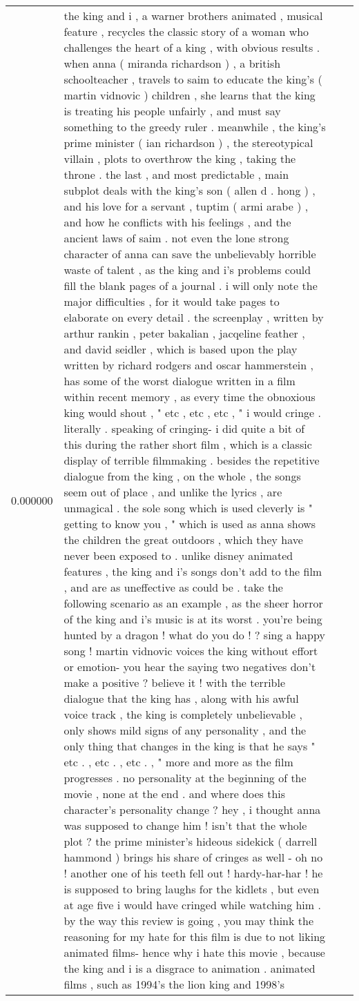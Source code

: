 \begin{tabular}{r{1cm} p{0.4in} r{1cm} p{0.4in}}
0.000000 & the king and i , a warner brothers animated , musical feature , recycles the classic story of a woman who challenges the heart of a king , with obvious results .  when anna ( miranda richardson ) , a british schoolteacher , travels to saim to educate the king's ( martin vidnovic ) children , she learns that the king is treating his people unfairly , and must say something to the greedy ruler .  meanwhile , the king's prime minister ( ian richardson ) , the stereotypical villain , plots to overthrow the king , taking the throne .  the last , and most predictable , main subplot deals with the king's son ( allen d . hong ) , and his love for a servant , tuptim ( armi arabe ) , and how he conflicts with his feelings , and the ancient laws of saim .  not even the lone strong character of anna can save the unbelievably horrible waste of talent , as the king and i's problems could fill the blank pages of a journal .  i will only note the major difficulties , for it would take pages to elaborate on every detail .  the screenplay , written by arthur rankin , peter bakalian , jacqeline feather , and david seidler , which is based upon the play written by richard rodgers and oscar hammerstein , has some of the worst dialogue written in a film within recent memory , as every time the obnoxious king would shout , " etc , etc , etc , " i would cringe .  literally .  speaking of cringing- i did quite a bit of this during the rather short film , which is a classic display of terrible filmmaking .  besides the repetitive dialogue from the king , on the whole , the songs seem out of place , and unlike the lyrics , are unmagical .  the sole song which is used cleverly is " getting to know you , " which is used as anna shows the children the great outdoors , which they have never been exposed to .  unlike disney animated features , the king and i's songs don't add to the film , and are as uneffective as could be .  take the following scenario as an example , as the sheer horror of the king and i's music is at its worst .  you're being hunted by a dragon !  what do you do ! ?  sing a happy song !  martin vidnovic voices the king without effort or emotion- you hear the saying two negatives don't make a positive ?  believe it !  with the terrible dialogue that the king has , along with his awful voice track , the king is completely unbelievable , only shows mild signs of any personality , and the only thing that changes in the king is that he says " etc . , etc . , etc . , " more and more as the film progresses .  no personality at the beginning of the movie , none at the end .  and where does this character's personality change ?  hey , i thought anna was supposed to change him !  isn't that the whole plot ?  the prime minister's hideous sidekick ( darrell hammond ) brings his share of cringes as well - oh no !  another one of his teeth fell out !  hardy-har-har !  he is supposed to bring laughs for the kidlets , but even at age five i would have cringed while watching him .  by the way this review is going , you may think the reasoning for my hate for this film is due to not liking animated films- hence why i hate this movie , because the king and i is a disgrace to animation .  animated films , such as 1994's the lion king and 1998's 
\end{tabular}

